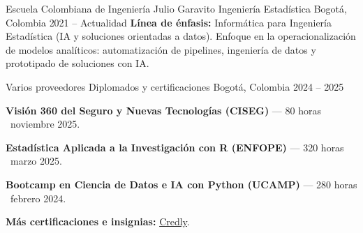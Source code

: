 
\begin{cventries}

  \cventry
    {Escuela Colombiana de Ingeniería Julio Garavito}
    {Ingeniería Estadística}
    {Bogotá, Colombia}
    {2021 -- Actualidad}
    {
      \vspace{0.3em}
      {\textbf{Línea de énfasis:} Informática para Ingeniería Estadística (IA y soluciones orientadas a datos).
      Enfoque en la operacionalización de modelos analíticos: automatización de pipelines, ingeniería de datos y prototipado de soluciones con IA.}
    }

  \vspace{0.6em}

  \cventry
    {Varios proveedores}
    {Diplomados y certificaciones}
    {Bogotá, Colombia}
    {2024 -- 2025}
    {
      \begin{cvitems}
        \item {\textbf{Visión 360 del Seguro y Nuevas Tecnologías (CISEG)} --- 80 horas \textbar\ noviembre 2025.}
        \item {\textbf{Estadística Aplicada a la Investigación con R (ENFOPE)} --- 320 horas \textbar\ marzo 2025.}
        \item {\textbf{Bootcamp en Ciencia de Datos e IA con Python (UCAMP)} --- 280 horas \textbar\ febrero 2024.}
        \item {\textbf{Más certificaciones e insignias:} \href{https://www.credly.com/users/sebastian-ramirez.6d8f476f}{Credly}.}
      \end{cvitems}
    }


\end{cventries}

